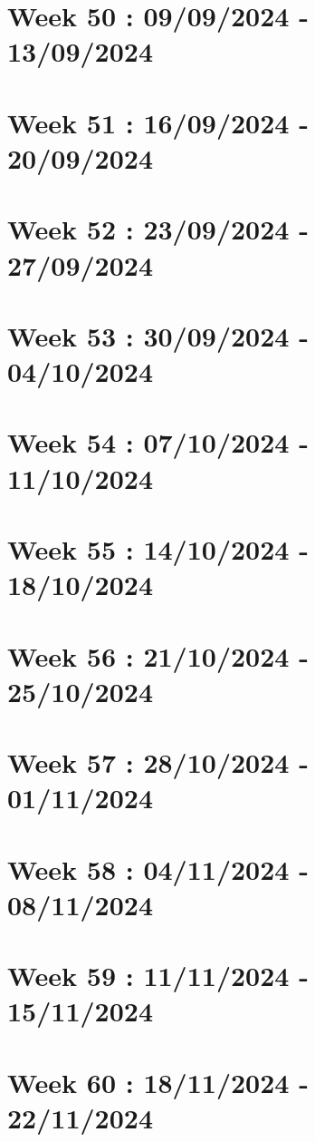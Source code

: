 \documentclass[french]{article}
\begin{document}
	\section{Week 50 : 09/09/2024 - 13/09/2024}
	

	\section{Week 51 : 16/09/2024 - 20/09/2024}
	

	\section{Week 52 : 23/09/2024 - 27/09/2024}

	\section{Week 53 : 30/09/2024 - 04/10/2024}

	\section{Week 54 : 07/10/2024 - 11/10/2024}

	\section{Week 55 : 14/10/2024 - 18/10/2024}

	\section{Week 56 : 21/10/2024 - 25/10/2024}

	\section{Week 57 : 28/10/2024 - 01/11/2024}

	\section{Week 58 : 04/11/2024 - 08/11/2024}

	\section{Week 59 : 11/11/2024 - 15/11/2024}

	\section{Week 60 : 18/11/2024 - 22/11/2024}
\end{document}
